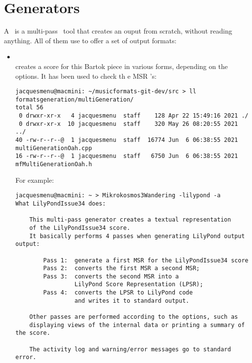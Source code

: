 \section{Generators}

A \generator\ is a multi-pass \CLI\ tool that creates an ouput from scratch, without reading anything. All of them use  to offer a set of output formats:
\begin{itemize}
\item {}\\
			creates a score for this Bartok piece in various forms, depending on the options. It has been used to check th e MSR \API's:

\begin{lstlisting}[language=Terminal]
jacquesmenu@macmini: ~/musicformats-git-dev/src > ll formatsgeneration/multiGeneration/
total 56
 0 drwxr-xr-x   4 jacquesmenu  staff    128 Apr 22 15:49:16 2021 ./
 0 drwxr-xr-x  10 jacquesmenu  staff    320 May 26 08:20:55 2021 ../
40 -rw-r--r--@  1 jacquesmenu  staff  16774 Jun  6 06:38:55 2021 multiGenerationOah.cpp
16 -rw-r--r--@  1 jacquesmenu  staff   6750 Jun  6 06:38:55 2021 mfMultiGenerationOah.h
\end{lstlisting}

For example:
\begin{lstlisting}[language=Terminal]
jacquesmenu@macmini: ~ > Mikrokosmos3Wandering -lilypond -a
What LilyPondIssue34 does:

    This multi-pass generator creates a textual representation
    of the LilyPondIssue34 score.
    It basically performs 4 passes when generating LilyPond output output:

        Pass 1:  generate a first MSR for the LilyPondIssue34 score
        Pass 2:  converts the first MSR a second MSR;
        Pass 3:  converts the second MSR into a
                 LilyPond Score Representation (LPSR);
        Pass 4:  converts the LPSR to LilyPond code
                 and writes it to standard output.

    Other passes are performed according to the options, such as
    displaying views of the internal data or printing a summary of the score.

    The activity log and warning/error messages go to standard error.
\end{lstlisting}


\end{itemize}
